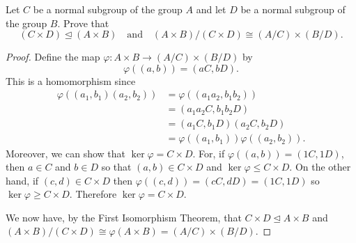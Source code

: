  Let $C$ be a normal subgroup of the group $A$ and let $D$
be a normal subgroup of the group $B$. Prove that
\begin{equation*}
  (C\times D)\trianglelefteq(A\times B)
  \quad\text{and}\quad
  (A\times B)/(C\times D)\cong(A/C)\times(B/D).
\end{equation*}
\begin{proof}
  Define the map $\varphi\colon A\times B\to(A/C)\times(B/D)$ by
  \begin{equation*}
    \varphi((a,b)) = (aC,bD).
  \end{equation*}
  This is a homomorphism since
  \begin{align*}
    \varphi((a_1,b_1)(a_2,b_2))
    &= \varphi((a_1a_2,b_1b_2)) \\
    &= (a_1a_2C, b_1b_2D) \\
    &= (a_1C,b_1D)(a_2C,b_2D) \\
    &= \varphi((a_1,b_1))\varphi((a_2,b_2)).
  \end{align*}
  Moreover, we can show that $\ker\varphi = C\times D$. For, if
  $\varphi((a,b)) = (1C,1D)$, then $a\in C$ and $b\in D$ so that
  $(a,b)\in C\times D$ and $\ker\varphi\leq C\times D$. On the other
  hand, if $(c,d)\in C\times D$ then
  $\varphi((c,d)) = (cC, dD) = (1C,1D)$ so
  $\ker\varphi\geq C\times D$. Therefore $\ker\varphi = C\times D$.

  We now have, by the First Isomorphism Theorem, that
  $C\times D\trianglelefteq A\times B$ and
  $(A\times B)/(C\times D)\cong \varphi(A\times B) =
  (A/C)\times(B/D)$.
\end{proof}
